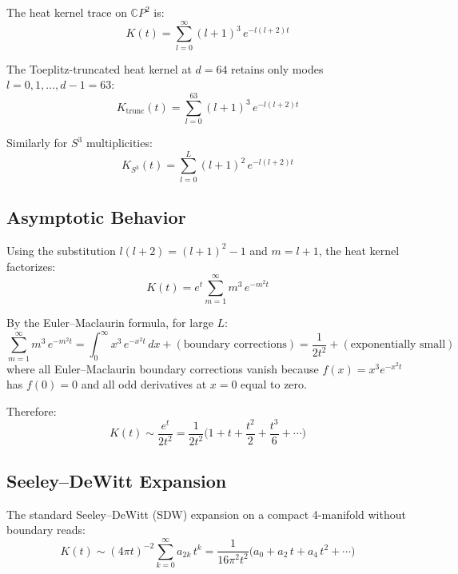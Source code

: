 \documentclass[12pt,a4paper]{article}
\begin{document}
The heat kernel trace on $\mathbb{C}P^2$ is:
\begin{equation}
K(t) = \sum_{l=0}^{\infty} (l+1)^3 \, e^{-l(l+2)t}
\label{eq:K-cont}
\end{equation}

The Toeplitz-truncated heat kernel at $d = 64$ retains only modes
$l = 0, 1, \ldots, d-1 = 63$:
\begin{equation}
K_{\mathrm{trunc}}(t) = \sum_{l=0}^{63} (l+1)^3 \, e^{-l(l+2)t}
\label{eq:K-trunc}
\end{equation}

Similarly for $S^3$ multiplicities:
\begin{equation}
K_{S^3}(t) = \sum_{l=0}^{L} (l+1)^2 \, e^{-l(l+2)t}
\label{eq:K-S3}
\end{equation}

\subsection{Asymptotic Behavior}

Using the substitution $l(l+2) = (l+1)^2 - 1$ and $m = l+1$, the heat
kernel factorizes:
\begin{equation}
K(t) = e^t \sum_{m=1}^{\infty} m^3 \, e^{-m^2 t}
\end{equation}

By the Euler--Maclaurin formula, for large $L$:
\begin{equation}
\sum_{m=1}^{\infty} m^3 \, e^{-m^2 t}
= \int_0^{\infty} x^3 \, e^{-x^2 t} \, dx + (\text{boundary corrections})
= \frac{1}{2t^2} + (\text{exponentially small})
\end{equation}
where all Euler--Maclaurin boundary corrections vanish because $f(x) = x^3 e^{-x^2 t}$
has $f(0) = 0$ and all odd derivatives at $x = 0$ equal to zero.

Therefore:
\begin{equation}
K(t) \sim \frac{e^t}{2t^2}
= \frac{1}{2t^2}\biggl(1 + t + \frac{t^2}{2} + \frac{t^3}{6} + \cdots\biggr)
\end{equation}

\subsection{Seeley--DeWitt Expansion}

The standard Seeley--DeWitt (SDW) expansion on a compact 4-manifold
without boundary reads:
\begin{equation}
K(t) \sim (4\pi t)^{-2} \sum_{k=0}^{\infty} a_{2k} \, t^k
= \frac{1}{16\pi^2 t^2} \bigl(a_0 + a_2\,t + a_4\,t^2 + \cdots\bigr)
\label{eq:SDW}
\end{equation}
\end{document}

